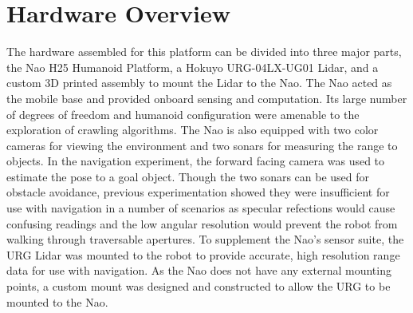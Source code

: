 \section{Hardware Overview}

The hardware assembled for this platform can be divided into three major parts,
the Nao H25 Humanoid Platform, a Hokuyo URG-04LX-UG01 Lidar, and a custom 3D
printed assembly to mount the Lidar to the Nao.
The Nao acted as the mobile base and provided onboard sensing and computation. 
Its large number of degrees of freedom and humanoid configuration were amenable
to the exploration of crawling algorithms.
The Nao is also equipped with two color cameras for viewing the environment
and two sonars for measuring the range to objects.
In the navigation experiment, the forward facing camera was used to estimate
the pose to a goal object. Though the two sonars can be used for obstacle
avoidance, previous experimentation showed they
were insufficient for use with navigation in a number of scenarios as
specular refections would cause confusing readings and the low angular
resolution would prevent the robot from walking through traversable apertures.
To supplement the Nao's sensor suite, the URG Lidar was mounted to the robot
to provide accurate, high resolution range data for use with navigation.
As the Nao does not have any external mounting points, a custom mount was
designed and constructed to allow the URG to be mounted to the Nao.







